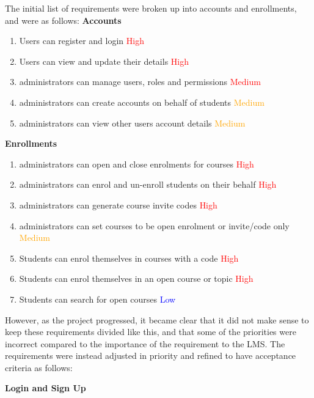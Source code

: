 The initial list of requirements were broken up into accounts and enrollments, and were as follows:
\textbf{Accounts}
    \begin{enumerate}
    \item Users can register and login \textcolor{Red}{High}
    \item Users can view and update their details \textcolor{Red}{High}
    \item administrators can manage users, roles and permissions \textcolor{Red}{Medium}
    \item administrators can create accounts on behalf of students \textcolor{Orange}{Medium}
    \item administrators can view other users account details \textcolor{Orange}{Medium}
    \end{enumerate}

\textbf{Enrollments}
    \begin{enumerate}
    \item administrators can open and close enrolments for courses \textcolor{Red}{High}
    \item administrators can enrol and un-enroll students on their behalf \textcolor{Red}{High}
    \item administrators can generate course invite codes \textcolor{Red}{High}
    \item administrators can set courses to be open enrolment or invite/code only \textcolor{Orange}{Medium}
    \item Students can enrol themselves in courses with a code \textcolor{Red}{High}
    \item Students can enrol themselves in an open course or topic \textcolor{Red}{High}
    \item Students can search for open courses \textcolor{Blue}{Low}
    \end{enumerate}

However, as the project progressed, it became clear that it did not make sense to keep these requirements divided like this, and that some of the priorities were incorrect compared to the importance of the requirement to the LMS. The requirements were instead adjusted in priority and refined to have acceptance criteria as follows:

\textbf{Login and Sign Up}

